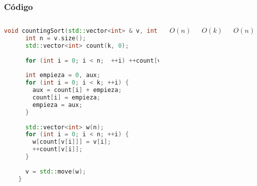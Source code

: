 \documentclass{beamer}
\begin{document}
\begin{frame}
\begin{columns}

\end{columns}
\end{frame}

\begin{frame}[fragile]
\frametitle{Código}
\begin{columns}
	
	\begin{lstlisting}[language = C++, basicstyle=\ttfamily\scriptsize]
	void countingSort(std::vector<int> & v, int k) { 
	  int n = v.size();
	  std::vector<int> count(k, 0);
	
	  for (int i = 0; i < n;  ++i) ++count[v[i]];
	
	  int empieza = 0, aux;
	  for (int i = 0; i < k; ++i) {
	    aux = count[i] + empieza;   
	    count[i] = empieza;         
	    empieza = aux;
	  }
	
	  std::vector<int> w(n);
	  for (int i = 0; i < n; ++i) {
 	    w[count[v[i]]] = v[i];     
	    ++count[v[i]];           
	  }
	
	  v = std::move(w);
	}
	\end{lstlisting}
	
	
	\vspace{1.7 cm}
	
	$O(n)$
	\vspace{1 cm}
	
	$O(k)$
	\vspace{1.5 cm}
	
	$O(n)$
	\vspace{2 cm}
\end{columns}

\end{frame}
\end{document}
